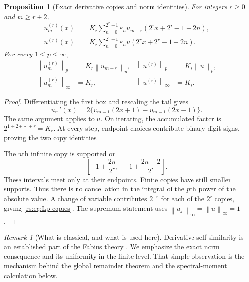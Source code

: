 \documentclass[11pt,a4paper,oneside,openany]{book}
\numberwithin{equation}{chapter}
\newtheorem{proposition}[theorem]{Proposition}
\theoremstyle{definition}
\theoremstyle{remark}
\newtheorem{remark}[theorem]{Remark}
\newcommand{\eps}{\varepsilon}
\newcommand{\norm}[1]{\left\lVert #1\right\rVert}
\begin{document}
\begin{proposition}[Exact derivative copies and norm identities]\label{rs:prop:copies}
For integers $r\geq0$ and $m\geq r+2$,
\begin{align}
 u_m^{(r)}(x)
 &=K_r\sum_{n=0}^{2^r-1}\eps_n
       u_{m-r}(2^r x+2^r-1-2n),\label{rs:eq:finite-copies}\\
 u^{(r)}(x)
 &=K_r\sum_{n=0}^{2^r-1}\eps_n
       u(2^r x+2^r-1-2n).\label{rs:eq:infinite-copies}
\end{align}
For every $1\leq p\leq\infty$,
\begin{align}
 \norm{u_m^{(r)}}_p&=K_r\norm{u_{m-r}}_p,
 &\norm{u^{(r)}}_p&=K_r\norm{u}_p,\label{rs:eq:Lp-copies}\\
 \norm{u_m^{(r)}}_\infty&=K_r,
 &\norm{u^{(r)}}_\infty&=K_r.\label{rs:eq:sharp-deriv-norm}
\end{align}
\end{proposition}
\begin{proof}
Differentiating the first box and rescaling the tail gives
\begin{equation}
 u_m'(x)=2\{u_{m-1}(2x+1)-u_{m-1}(2x-1)\}.
 \label{rs:eq:refinement-derivative}
\end{equation}
The same argument applies to $u$. On iterating, the accumulated
factor is $2^{1+2+\cdots+r}=K_r$. At every step, endpoint choices
contribute binary digit signs, proving the two copy identities.

The $n$th infinite copy is supported on
\begin{equation}
 \left[-1+\frac{2n}{2^r},\ -1+\frac{2n+2}{2^r}\right].
\end{equation}
These intervals meet only at their endpoints. Finite copies have still
smaller supports. Thus there is no cancellation in the integral of the
$p$th power of the absolute value. A change of variable contributes
$2^{-r}$ for each of the $2^r$ copies, giving
\eqref{rs:eq:Lp-copies}. The supremum statement uses
$\norm{u_j}_\infty=\norm{u}_\infty=1$.
\end{proof}

\begin{remark}[What is classical, and what is used here]
Derivative self-similarity is an established part of the Fabius theory
\cite{arias1982,arias2018}. We emphasize the exact norm consequence and
its uniformity in the finite level. That simple observation is the
mechanism behind the global remainder theorem and the spectral-moment
calculation below.
\end{remark}
\end{document}
